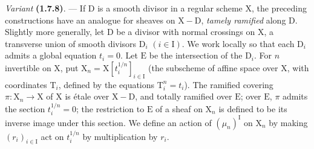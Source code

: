 \documentclass[11pt,leqno]{article}
\begin{document}
\textit{Variant} \textbf{(1.7.8)}. — If \(\mathrm{D}\) is a smooth divisor in a regular scheme \(\mathrm{X}\), the preceding constructions have an analogue for sheaves on \(\mathrm{X}-\mathrm{D}\), \textit{tamely ramified} along \(\mathrm{D}\). Slightly more generally, let \(\mathrm{D}\) be a divisor with normal crossings on \(\mathrm{X}\), a transverse union of smooth divisors \(\mathrm{D}_i\) \((i\in\mathrm{I})\). We work locally so that each \(\mathrm{D}_i\) admits a global equation \(t_i=0\). Let \(\mathrm{E}\) be the intersection of the \(\mathrm{D}_i\). For \(n\) invertible on \(\mathrm{X}\), put \(\mathrm{X}_n=\mathrm{X}[t_i^{1/n}]_{i\in\mathrm{I}}\) (the subscheme of affine space over \(\mathrm{X}\), with coordinates \(\mathrm{T}_i\), defined by the equations \(\mathrm{T}_i^n=t_i\)). The ramified covering \(\pi:\mathrm{X}_n\to\mathrm{X}\) of \(\mathrm{X}\) is étale over \(\mathrm{X}-\mathrm{D}\), and totally ramified over \(\mathrm{E}\); over \(\mathrm{E}\), \(\pi\) admits the section \(t_i^{1/n}=0\); the restriction to \(\mathrm{E}\) of a sheaf on \(\mathrm{X}_n\) is defined to be its inverse image under this section. We define an action of \((\mu_n)^{\mathrm{I}}\) on \(\mathrm{X}_n\) by making \((r_i)_{i\in\mathrm{I}}\) act on \(t_i^{1/n}\) by multiplication by \(r_i\).
\end{document}
